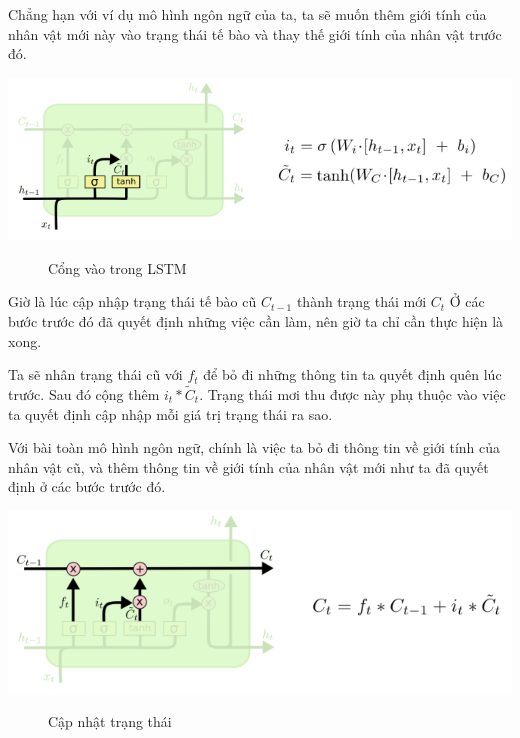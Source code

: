 Chẳng hạn với ví dụ mô hình ngôn ngữ của ta, ta sẽ muốn thêm giới tính của nhân vật mới này vào trạng thái tế bào và thay thế giới tính của nhân vật trước đó.
\begin{center}
    \includegraphics[scale=.5]{image/chapter6/bt2.png}
    \begin{figure}[htp]
    \begin{center}
     
    \end{center}
    \caption{Cổng vào trong LSTM}
    \end{figure}
\end{center}
Giờ là lúc cập nhập trạng thái tế bào cũ $C_{t-1}$ thành trạng thái mới $C_{t}$ Ở các bước trước đó đã quyết định những việc cần làm, nên giờ ta chỉ cần thực hiện là xong.\par
Ta sẽ nhân trạng thái cũ với $f_{t}$ để bỏ đi những thông tin ta quyết định quên lúc trước. Sau đó cộng thêm $i_{t} * \widetilde{C}_{t}$. Trạng thái mơi thu được này phụ thuộc vào việc ta quyết định cập nhập mỗi giá trị trạng thái ra sao.\par
Với bài toàn mô hình ngôn ngữ, chính là việc ta bỏ đi thông tin về giới tính của nhân vật cũ, và thêm thông tin về giới tính của nhân vật mới như ta đã quyết định ở các bước trước đó.
\begin{center}
    \includegraphics[scale=.5]{image/chapter6/bt3.png}
    \begin{figure}[htp]
    \begin{center}
     
    \end{center}
    \caption{Cập nhật trạng thái}
    \end{figure}
\end{center}
